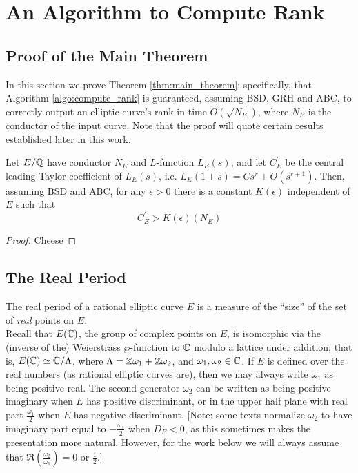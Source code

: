 \documentclass[10pt]{article}
\newcommand{\pr}{^{\prime}}
\newcommand{\Les}{L_E(s)}
\begin{document}

\newpage
\section{An Algorithm to Compute Rank}
\subsection{Proof of the Main Theorem}\label{sec:main_thrm_proof}

In this section we prove Theorem \ref{thm:main_theorem}: specifically, that Algorithm \ref{algo:compute_rank} is guaranteed, assuming BSD, GRH and ABC, to correctly output an elliptic curve's rank in time $\tilde{O}(\sqrt{N_E})$, where $N_E$ is the conductor of the input curve. Note that the proof will quote certain results established later in this work. \\

\begin{proposition}\label{prop:leading_coeff_lower_bound}
Let $E/\mathbb{Q}$ have conductor $N_E$ and $L$-function $\Les$, and let $C\pr_E$ be the central leading Taylor coefficient of $\Les$, i.e. $L_E(1+s) = Cs^r  + O(s^{r+1})$. Then, assuming BSD and ABC, for any $\epsilon>0$ there is a constant $K(\epsilon)$ independent of $E$ such that
\begin{equation}
C\pr_E > K(\epsilon) (N_E)
\end{equation}
\end{proposition}
\begin{proof}
Cheese
\end{proof}

\newpage
\subsection{The Real Period}

The real period of a rational elliptic curve $E$ is a measure of the ``size'' of the set of {\it real} points on $E$. \\

Recall that $E(\mathbb{C})$, the group of complex points on $E$, is isomorphic via the (inverse of the) Weierstrass $\wp$-function to $\mathbb{C}$ modulo a lattice under addition; that is, $E(\mathbb{C}) \simeq \mathbb{C}/\Lambda$, where $\Lambda = \mathbb{Z}\omega_1 + \mathbb{Z}\omega_2$, and $\omega_1,\omega_2 \in \mathbb{C}$.
If $E$ is defined over the real numbers (as rational elliptic curves are), then we may always write $\omega_1$ as being positive real. The second generator $\omega_2$ can be written as being positive imaginary when $E$ has positive discriminant, or in the upper half plane with real part $\frac{\omega_1}{2}$ when $E$ has negative discriminant. [Note: some texts normalize $\omega_2$ to have imaginary part equal to $-\frac{\omega_1}{2}$ when $D_E<0$, as this sometimes makes the presentation more natural. However, for the work below we will always assume that $\Re(\frac{\omega_2}{\omega_1}) = 0$ or $\frac{1}{2}$.]
\end{document}
